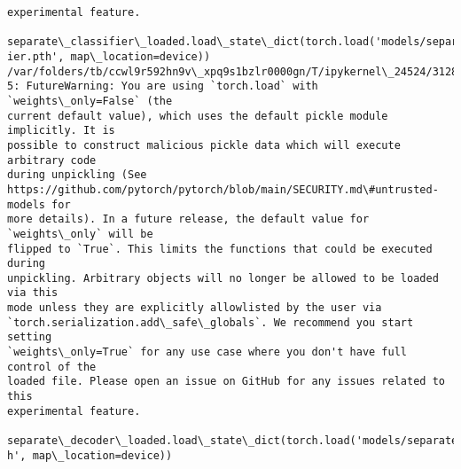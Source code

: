 \documentclass[11pt]{article}
\begin{document}
\begin{Verbatim}[commandchars=\\\{\}]
experimental feature.
  separate\_classifier\_loaded.load\_state\_dict(torch.load('models/separate\_classif
ier.pth', map\_location=device))
/var/folders/tb/ccwl9r592hn9v\_xpq9s1bzlr0000gn/T/ipykernel\_24524/3128444424.py:1
5: FutureWarning: You are using `torch.load` with `weights\_only=False` (the
current default value), which uses the default pickle module implicitly. It is
possible to construct malicious pickle data which will execute arbitrary code
during unpickling (See
https://github.com/pytorch/pytorch/blob/main/SECURITY.md\#untrusted-models for
more details). In a future release, the default value for `weights\_only` will be
flipped to `True`. This limits the functions that could be executed during
unpickling. Arbitrary objects will no longer be allowed to be loaded via this
mode unless they are explicitly allowlisted by the user via
`torch.serialization.add\_safe\_globals`. We recommend you start setting
`weights\_only=True` for any use case where you don't have full control of the
loaded file. Please open an issue on GitHub for any issues related to this
experimental feature.
  separate\_decoder\_loaded.load\_state\_dict(torch.load('models/separate\_decoder.pt
h', map\_location=device))
    \end{Verbatim}
\end{document}
